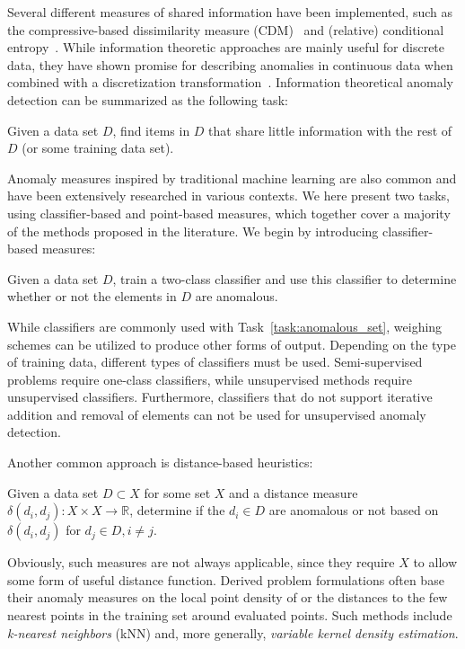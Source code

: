 Several different measures of shared information have been implemented, such as the compressive-based dissimilarity measure (CDM)~\cite{keogh2} and (relative) conditional entropy~\cite{xiang}. While information theoretic approaches are mainly useful for discrete data, they have shown promise for describing anomalies in continuous data when combined with a discretization transformation~\cite{keogh2}. Information theoretical anomaly detection can be summarized as the following task:

\begin{task}
  Given a data set $D$, find items in $D$ that share little information with the rest of $D$ (or some training data set).
\end{task}

Anomaly measures inspired by traditional machine learning are also common and have been extensively researched in various contexts. We here present two tasks, using classifier-based and point-based measures, which together cover a majority of the methods proposed in the literature. We begin by introducing classifier-based measures:

\begin{task}
  Given a data set $D$, train a two-class classifier and use this classifier to determine whether or not the elements in $D$ are anomalous.
\end{task}

While classifiers are commonly used with Task~\ref{task:anomalous_set}, weighing schemes can be utilized to produce other forms of output. Depending on the type of training data, different types of classifiers must be used. Semi-supervised problems require one-class classifiers, while unsupervised methods require unsupervised classifiers. Furthermore, classifiers that do not support iterative addition and removal of elements can not be used for unsupervised anomaly detection.

Another common approach is distance-based heuristics:
\begin{task}
  Given a data set $D \subset X$ for some set $X$ and a distance measure $\delta(d_i, d_j): X \times X \rightarrow \mathbb{R}$, determine if the $d_i \in D$ are anomalous or not based on $\delta(d_i, d_j)$ for $d_j \in D, i \neq j$.
\end{task}
Obviously, such measures are not always applicable, since they require $X$ to allow some form of useful distance function. Derived problem formulations often base their anomaly measures on the local point density of or the distances to the few nearest points in the training set around evaluated points. Such methods include \emph{k-nearest neighbors} (kNN) and, more generally, \emph{variable kernel density estimation}.

